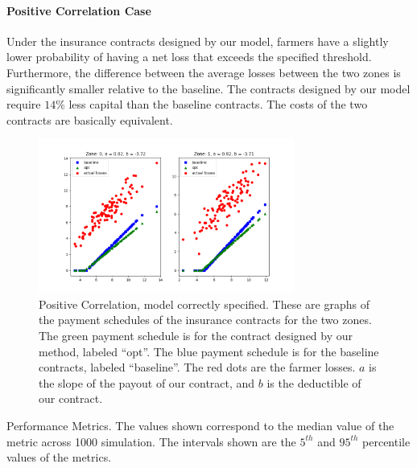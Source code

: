 \documentclass[11pt]{article}
\begin{document}
      \paragraph{Positive Correlation Case} Under the insurance contracts designed by our model, farmers have a slightly lower probability of having a net loss that exceeds the specified threshold. Furthermore, the difference between the average losses between the two zones is significantly smaller relative to the baseline. The contracts designed by our model require $14\%$ less capital than the baseline contracts. The costs of the two contracts are basically equivalent. 
      \begin{figure}[H]
          \centering
          \includegraphics[width=0.75\textwidth]{../../output/figures/Bootstrap/pos_corr_linear.png}
          \caption{Positive Correlation, model correctly specified. These are graphs of the payment schedules of the insurance contracts for the two zones. The green payment schedule is for the contract designed by our method, labeled ``opt''. The blue payment schedule is for the baseline contracts, labeled ``baseline''. The red dots are the farmer losses. $a$ is the slope of the payout of our contract, and $b$ is the deductible of our contract.}
      \end{figure}

      \begin{table}[H]
          \centering
          
          
          \caption{Performance Metrics. The values shown correspond to the median value of the metric across 1000 simulation. The intervals shown are the $5^{th}$ and $95^{th}$ percentile values of the metrics.}
      \end{table}
      \FloatBarrier
\end{document}
